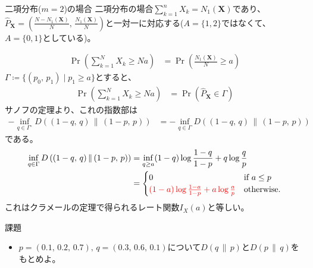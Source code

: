 \documentclass[lualatex,handout]{beamer}
\newcommand{\mycolor}[2]{%
  \begingroup
  \colorlet{currentcolor}{.}%
  \color{#1}#2%
  \color{currentcolor}%
  \endgroup
}
\newcommand{\emm}[1]{\mycolor{red}{#1}}
\newcommand\KL[2]{D\left(#1\,\|\,#2\right)}
\theoremstyle{definition}
\begin{document}
\begin{frame}{二項分布($m=2$)の場合}
\footnotesize
二項分布の場合$\sum_{k=1}^n X_k=N_1(\symbf{X})$であり、$\widehat{P}_{\symbf{X}}=\left(\frac{N-N_1(\symbf{X})}N,\,\frac{N_1(\symbf{X})}N\right)$と一対一に対応する($A=\{1,2\}$ではなくて、$A=\{0,1\}$としている)。

\begin{align*}
\Pr\left(\sum_{k=1}^N X_k \ge Na\right)
&=
\Pr\left(\frac{N_1(\symbf{X})}{N} \ge a\right)
\end{align*}
$\Gamma\coloneq \{(p_0,\,p_1)\mid p_1\ge a\}$とすると、
\begin{align*}
\Pr\left(\sum_{k=1}^N X_k \ge Na\right)
&=
\Pr\left(\widehat{P}_{\symbf{X}} \in\Gamma\right)
\end{align*}
サノフの定理より、これの指数部は
\begin{align*}
-\inf_{q\in\Gamma^\circ} \KL{(1-q,\,q)}{(1-p,\,p)}
&=-\inf_{q\in\Gamma} \KL{(1-q,\,q)}{(1-p,\,p)}
\end{align*}
である。
\begin{align*}
\inf_{q\in\Gamma} \KL{(1-q,\,q)}{(1-p,\,p)}&= \inf_{q\ge a} (1-q)\log\frac{1-q}{1-p} + q\log\frac{q}{p}\\
&= 
\begin{cases}
0&\text{if } a\le p\\
\emm{(1-a)\log\frac{1-a}{1-p} + a\log\frac{a}{p}}& \text{otherwise.}
\end{cases}
\end{align*}
これはクラメールの定理で得られるレート関数$I_X(a)$と等しい。
\end{frame}

\begin{frame}{課題}
\begin{itemize}
\item $p=(0.1,\,0.2,\,0.7),\,q=(0.3,\,0.6,\,0.1)$について$\KL{q}{p}$と$\KL{p}{q}$をもとめよ。
\end{itemize}
\end{frame}
\end{document}
